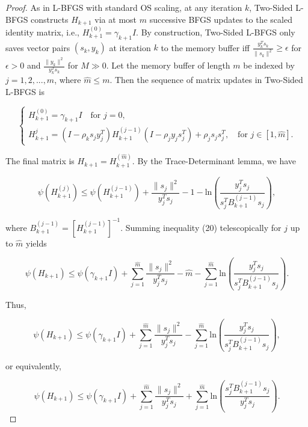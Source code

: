 \documentclass[10pt,a4paper]{amsart}
\begin{document}
\begin{proof}
As in L-BFGS with standard OS scaling, at any iteration $k$, Two-Sided L-BFGS constructs $H_{k+1}$ via at most $m$ successive BFGS updates to the scaled identity matrix, i.e., $H_{k+1}^{(0)} = \gamma_{k+1}I$. By construction, Two-Sided L-BFGS only saves vector pairs $(s_k, y_k)$ at iteration $k$ to the memory buffer iff $\frac{y_k^T s_k}{\|s_k\|^2} \geq \epsilon$ for $\epsilon > 0$ and $\frac{\|y_k\|^2}{y_k^T s_k}$ for $M \gg 0$. Let the memory buffer of length $m$ be indexed by $j = 1,2, ..., \hat{m}$, where $\hat{m} \leq m$. Then the sequence of matrix updates in Two-Sided L-BFGS is

\begin{equation}
    \begin{cases}
        H_{k+1}^{(0)} = \gamma_{k+1}I \quad \text{for }j=0, \\
        H_{k+1}^{j} = (I - \rho_k s_jy_j^T)H_{k+1}^{(j-1)}(I - \rho_j y_j s_j^T) + \rho_j s_j s_j^T, \quad \text{for } j \in [1, \hat{m}].
    \end{cases}
\end{equation}

\noindent
The final matrix is $H_{k+1} = H_{k+1}^{(\hat{m})}$. By the Trace-Determinant lemma, we have

\begin{equation}
\psi(H_{k+1}^{(j)}) \leq \psi(H_{k+1}^{(j-1)}) + \frac{\|s_j\|^2}{y_j^T s_j} - 1 - \text{ln}(\frac{y_j^T s_j}{s_j^T B_{k+1}^{(j-1)}s_j}),
\end{equation}

\noindent
where $B_{k+1}^{(j-1)} = [H_{k+1}^{(j-1)}]^{-1}$. Summing inequality (20) telescopically for $j$ up to $\hat{m}$ yields

\begin{equation}
\psi(H_{k+1}) \leq \psi(\gamma_{k+1}I) + \sum_{j=1}^{\hat{m}}\frac{\|s_j\|^2}{y_j^T s_j} - \hat{m} - \sum_{j=1}^{\hat{m}}\text{ln}(\frac{y_j^T s_j}{s_j^T B_{k+1}^{(j-1)}s_j}).
\end{equation}

\noindent
Thus, 

\begin{equation}
\psi(H_{k+1}) \leq \psi(\gamma_{k+1}I) + \sum_{j=1}^{\hat{m}}\frac{\|s_j\|^2}{y_j^T s_j} - \sum_{j=1}^{\hat{m}}\text{ln}(\frac{y_j^T s_j}{s_j^T B_{k+1}^{(j-1)}s_j}),
\end{equation}

\noindent
or equivalently,

\begin{equation}
\psi(H_{k+1}) \leq \psi(\gamma_{k+1}I) + \sum_{j=1}^{\hat{m}}\frac{\|s_j\|^2}{y_j^T s_j} + \sum_{j=1}^{\hat{m}}\text{ln}(\frac{s_j^T B_{k+1}^{(j-1)}s_j}{y_j^T s_j}).
\end{equation}


\end{proof}
\end{document}
